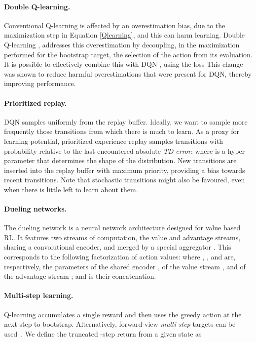 \documentclass[letterpaper]{article} \usepackage{aaai18}  \usepackage{times}  \usepackage{helvet}  \usepackage{courier}  \usepackage{url}  \usepackage{graphicx}  \usepackage{amsmath,amssymb}
\begin{document}
\paragraph{Double Q-learning.}
Conventional Q-learning is affected by an overestimation bias, due to the maximization step in Equation \ref{Qlearning}, and this can harm learning. Double Q-learning \cite{Hasselt2010double}, addresses this overestimation by decoupling, in the maximization performed for the bootstrap target, the selection of the action from its evaluation. It is possible to effectively combine this with DQN \cite{van2016deep}, using the loss
  This change was shown to reduce harmful overestimations that were present for DQN, thereby improving performance.

\paragraph{Prioritized replay.}
DQN samples uniformly from the replay buffer. Ideally, we want to sample more frequently those transitions from which there is much to learn. As a proxy for learning potential, prioritized experience replay \cite{schaul2015prioritized} samples transitions with probability  relative to the last encountered absolute \textit{TD error}:
  where  is a hyper-parameter that determines the shape of the distribution.
New transitions are inserted into the replay buffer with maximum priority, providing a bias towards recent transitions. Note that stochastic transitions might also be favoured, even when there is little left to learn about them.

\paragraph{Dueling networks.}
The dueling network is a neural network architecture designed for value based RL. It features two streams of computation, the value and advantage streams, sharing a convolutional encoder, and merged by a special aggregator \cite{wang2016dueling}. This corresponds to the following factorization of action values:
  where , , and  are, respectively, the parameters of the shared encoder , of the value stream , and of the advantage stream ; and  is their concatenation.

\paragraph{Multi-step learning.}
Q-learning accumulates a single reward and then uses the greedy action at the next step to bootstrap. Alternatively, forward-view \textit{multi-step} targets can be used~\cite{Sutton:1988}.  We define the truncated -step return from a given state  as
\end{document}
